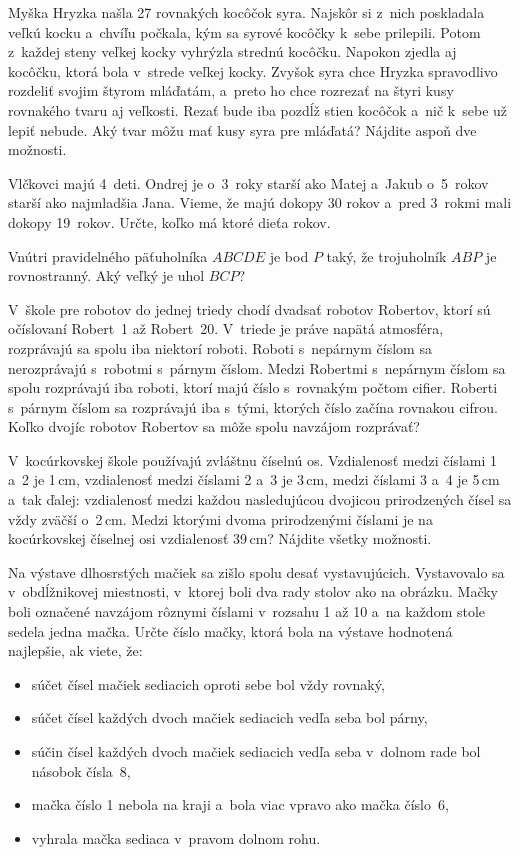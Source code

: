 {%
Myška Hryzka našla 27 rovnakých kocôčok syra.
Najskôr si z~nich poskladala veľkú kocku a~chvíľu počkala, kým sa syrové kocôčky k~sebe prilepili.
Potom z~každej steny veľkej kocky vyhrýzla strednú kocôčku.
Napokon zjedla aj kocôčku, ktorá bola v~strede veľkej kocky.
Zvyšok syra chce Hryzka spravodlivo rozdeliť svojim štyrom mláďatám, a~preto ho chce rozrezať na štyri kusy rovnakého tvaru aj veľkosti.
Rezať bude iba pozdĺž stien kocôčok a~nič k~sebe už lepiť nebude.
Aký tvar môžu mať kusy syra pre mláďatá? Nájdite aspoň dve možnosti.
}

{%
Vlčkovci majú 4~deti.
Ondrej je o~3~roky starší ako Matej a~Jakub o~5~rokov starší ako najmladšia Jana.
Vieme, že majú dokopy 30 rokov a~pred 3~rokmi mali dokopy 19~rokov.
Určte, koľko má ktoré dieťa rokov.
}

{%
Vnútri pravidelného päťuholníka $ABCDE$ je bod $P$ taký, že trojuholník
$ABP$ je rovnostranný.
Aký veľký je uhol $BCP$?
}

{%
V~škole pre robotov do jednej triedy chodí dvadsať robotov Robertov, ktorí sú očíslovaní Robert~1 až Robert~20.
V~triede je práve napätá atmosféra, rozprávajú sa spolu iba niektorí roboti.
Roboti s~nepárnym číslom sa nerozprávajú s~robotmi s~párnym číslom.
Medzi Robertmi s~nepárnym číslom sa spolu rozprávajú iba roboti, ktorí majú číslo s~rovnakým počtom cifier.
Roberti s~párnym číslom sa rozprávajú iba s~tými, ktorých číslo začína rovnakou cifrou.
Koľko dvojíc robotov Robertov sa môže spolu navzájom rozprávať?
}

{%
V~kocúrkovskej škole používajú zvláštnu číselnú os.
Vzdialenosť medzi číslami 1 a~2 je 1\,cm, vzdialenosť medzi číslami 2 a~3 je 3\,cm,
medzi číslami 3 a~4 je 5\,cm a~tak ďalej:
vzdialenosť medzi každou nasledujúcou dvojicou prirodzených čísel sa vždy zväčší o~2\,cm.
Medzi ktorými dvoma prirodzenými číslami je na kocúrkovskej číselnej osi
vzdialenosť 39\,cm?
Nájdite všetky možnosti.
}

{%
Na výstave dlhosrstých mačiek sa zišlo spolu desať vystavujúcich.
Vystavovalo sa v~obdĺžnikovej miestnosti, v~ktorej boli dva rady stolov ako na obrázku.
%
Mačky boli označené navzájom rôznymi číslami v~rozsahu 1 až 10 a~na každom stole sedela jedna mačka.
Určte číslo mačky, ktorá bola na výstave hodnotená najlepšie, ak viete, že:
\begin{itemize}
\item súčet čísel mačiek sediacich oproti sebe bol vždy rovnaký,
\item súčet čísel každých dvoch mačiek sediacich vedľa seba bol párny,
\item súčin čísel každých dvoch mačiek sediacich vedľa seba v~dolnom rade bol násobok čísla~8,
\item mačka číslo 1 nebola na kraji a~bola viac vpravo ako mačka číslo~6,
\item vyhrala mačka sediaca v~pravom dolnom rohu.
\end{itemize}
}

